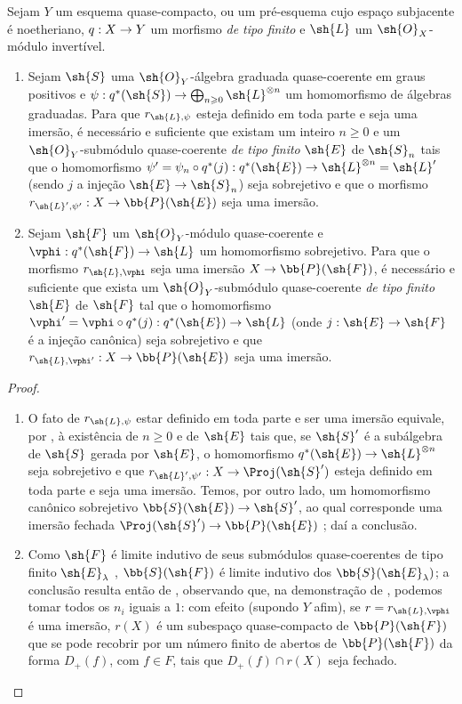 \documentclass[oneside,10pt]{amsart}
\makeatletter
\renewcommand{\geq}{\geqslant}
\newcommand{\ega@arrow}[2]{\mathchoice{#1}{#2}{#2}{#2}}
\renewcommand{\to}{\ega@arrow{\longrightarrow}{\rightarrow}}
\newcommand{\oldpage}[2][]{\marginnote{\normalfont\footnotesize\textbf{#1}~|~#2}\ignorespaces}
\let\EGAOriginalLabel\label
\renewcommand{\label}[1]{\phantomsection\EGAOriginalLabel{#1}}
\makeatother
\begin{document}
\begin{proposition}[4.4.1]
\label{II.4.4.1}
Sejam $Y$ um esquema quase-compacto, ou um pré-esquema cujo espaço subjacente é noetheriano, $q:X\to Y$ um morfismo \emph{de tipo finito} e $\sh{L}$ um $\sh{O}_X$-módulo invertível.
\begin{enumerate}
  \item[\rm{(i)}] Sejam $\sh{S}$ uma $\sh{O}_Y$-álgebra graduada quase-coerente em graus positivos e $\psi:q^*(\sh{S})\to\bigoplus_{n\geq0}\sh{L}^{\otimes n}$ um homomorfismo de álgebras graduadas.
    Para que $r_{\sh{L},\psi}$ esteja definido em toda parte e seja uma imersão, é necessário e
\oldpage[II]{79}
suficiente que existam um inteiro $n\geq0$ e um $\sh{O}_Y$-submódulo quase-coerente \emph{de tipo finito} $\sh{E}$ de $\sh{S}_n$ tais que o homomorfismo $\psi'=\psi_n\circ q^*(j):q^*(\sh{E})\to\sh{L}^{\otimes n}=\sh{L}'$ (sendo $j$ a injeção $\sh{E}\to\sh{S}_n$) seja sobrejetivo e que o morfismo $r_{\sh{L}',\psi'}:X\to\bb{P}(\sh{E})$ seja uma imersão.
  \item[\rm{(ii)}] Sejam $\sh{F}$ um $\sh{O}_Y$-módulo quase-coerente e $\vphi:q^*(\sh{F})\to\sh{L}$ um homomorfismo sobrejetivo.
    Para que o morfismo $r_{\sh{L},\vphi}$ seja uma imersão $X\to\bb{P}(\sh{F})$, é necessário e suficiente que exista um $\sh{O}_Y$-submódulo quase-coerente \emph{de tipo finito} $\sh{E}$ de $\sh{F}$ tal que o homomorfismo $\vphi'=\vphi\circ q^*(j):q^*(\sh{E})\to\sh{L}$ (onde $j:\sh{E}\to\sh{F}$ é a injeção canônica) seja sobrejetivo e que $r_{\sh{L},\vphi'}:X\to\bb{P}(\sh{E})$ seja uma imersão.
\end{enumerate}
\end{proposition}

\begin{proof}
\medskip\noindent
\begin{enumerate}
  \item[\rm{(i)}] O fato de $r_{\sh{L},\psi}$ estar definido em toda parte e ser uma imersão equivale, por , à existência de $n\geq0$ e de $\sh{E}$ tais que, se $\sh{S}'$ é a subálgebra de $\sh{S}$ gerada por $\sh{E}$, o homomorfismo $q^*(\sh{E})\to\sh{L}^{\otimes n}$ seja sobrejetivo e que $r_{\sh{L}',\psi'}:X\to\Proj(\sh{S}')$ esteja definido em toda parte e seja uma imersão.
    Temos, por outro lado, um homomorfismo canônico sobrejetivo $\bb{S}(\sh{E})\to\sh{S}'$, ao qual corresponde uma imersão fechada $\Proj(\sh{S}')\to\bb{P}(\sh{E})$ ;
    daí a conclusão.
  \item[\rm{(ii)}] Como $\sh{F}$ é limite indutivo de seus submódulos quase-coerentes de tipo finito $\sh{E}_\lambda$ , $\bb{S}(\sh{F})$ é limite indutivo dos $\bb{S}(\sh{E}_\lambda)$;
    a conclusão resulta então de , observando que, na demonstração de , podemos tomar todos os $n_i$ iguais a $1$:
    com efeito (supondo $Y$ afim), se $r=r_{\sh{L},\vphi}$ é uma imersão, $r(X)$ é um subespaço quase-compacto de $\bb{P}(\sh{F})$ que se pode recobrir por um número finito de abertos de $\bb{P}(\sh{F})$ da forma $D_+(f)$, com $f\in F$, tais que $D_+(f)\cap r(X)$ seja fechado.
\end{enumerate}
\end{proof}
\end{document}
